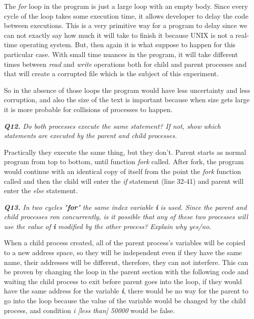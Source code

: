 \documentclass[11pt]{article}
\begin{document}
The \textit{for} loop in the program is just a large loop with an empty body. Since every cycle of the loop takes some execution time, it allows developer to delay the code between executions. This is a very primitive way for a program to delay since we can not exactly say how much it will take to finish it because UNIX is not a real-time operating system. But, then again it is what suppose to happen for this particular case. With small time nuances in the program, it will take different times between \textit{read} and \textit{write} operations both for child and parent processes and that will create a corrupted file which is the subject of this experiment.

So in the absence of those loops the program would have less uncertainty and less corruption, and also the size of the text is important because when size gets large it is more probable for collisions of processes to happen.



\vspace{5mm}
\textit{\textbf{Q12.} Do both processes execute the same statement? If not, show which statements are executed by the parent and child processes.}
\vspace{5mm}

Practically they execute the same thing, but they don't. Parent starts as normal program from top to bottom, until function \textit{fork} called. After fork, the program would continue with an identical copy of itself from the point the \textit{fork} function called and then the child will enter the \textit{if} statement (line 32-41) and parent will enter the \textit{else} statement.

\vspace{5mm}
\textit{\textbf{Q13.} In two cycles "\textbf{for}" the same index variable \textit{\textbf{i}} is used. Since the parent and child processes ron concurrently, is it possible that any of these two processes will use the value of \textit{\textbf{i}} modified by the other process? Explain why yes/no.}
\vspace{5mm}

When a child process created, all of the parent process's variables will be copied to a new address space, so they will be independent even if they have the same name, their addresses will be different, therefore, they can not interfere. This can be proven by changing the loop in the parent section with the following code and waiting the child process to exit before parent goes into the loop, if they would have the same address for the variable \textit{\textbf{i}}, there would be no way for the parent to go into the loop because the value of the variable would be changed by the child process, and condition \textit{i [less than] 50000} would be false.
\end{document}

